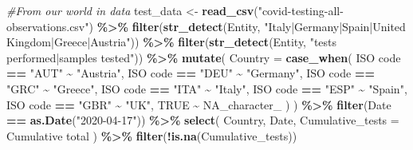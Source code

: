 \documentclass[
]{article}
\newenvironment{Shaded}{\begin{snugshade}}{\end{snugshade}}
\newcommand{\CommentTok}[1]{\textcolor[rgb]{0.56,0.35,0.01}{\textit{#1}}}
\newcommand{\DataTypeTok}[1]{\textcolor[rgb]{0.13,0.29,0.53}{#1}}
\newcommand{\KeywordTok}[1]{\textcolor[rgb]{0.13,0.29,0.53}{\textbf{#1}}}
\newcommand{\NormalTok}[1]{#1}
\newcommand{\OperatorTok}[1]{\textcolor[rgb]{0.81,0.36,0.00}{\textbf{#1}}}
\newcommand{\OtherTok}[1]{\textcolor[rgb]{0.56,0.35,0.01}{#1}}
\newcommand{\StringTok}[1]{\textcolor[rgb]{0.31,0.60,0.02}{#1}}
\begin{document}
\begin{Shaded}
\begin{Highlighting}[]
\CommentTok{\#From our world in data}
\NormalTok{test\_data \textless{}{-}}\StringTok{ }\KeywordTok{read\_csv}\NormalTok{(}\StringTok{"covid{-}testing{-}all{-}observations.csv"}\NormalTok{) }\OperatorTok{\%\textgreater{}\%}
\StringTok{  }\KeywordTok{filter}\NormalTok{(}\KeywordTok{str\_detect}\NormalTok{(Entity, }\StringTok{"Italy|Germany|Spain|United Kingdom|Greece|Austria"}\NormalTok{)) }\OperatorTok{\%\textgreater{}\%}
\StringTok{  }\KeywordTok{filter}\NormalTok{(}\KeywordTok{str\_detect}\NormalTok{(Entity, }\StringTok{"tests performed|samples tested"}\NormalTok{)) }\OperatorTok{\%\textgreater{}\%}\StringTok{ }
\StringTok{  }\KeywordTok{mutate}\NormalTok{(}
    \DataTypeTok{Country =} \KeywordTok{case\_when}\NormalTok{(}
      \StringTok{\textasciigrave{}}\DataTypeTok{ISO code}\StringTok{\textasciigrave{}} \OperatorTok{==}\StringTok{ "AUT"} \OperatorTok{\textasciitilde{}}\StringTok{ "Austria"}\NormalTok{,}
      \StringTok{\textasciigrave{}}\DataTypeTok{ISO code}\StringTok{\textasciigrave{}} \OperatorTok{==}\StringTok{ "DEU"} \OperatorTok{\textasciitilde{}}\StringTok{ "Germany"}\NormalTok{,}
      \StringTok{\textasciigrave{}}\DataTypeTok{ISO code}\StringTok{\textasciigrave{}} \OperatorTok{==}\StringTok{ "GRC"} \OperatorTok{\textasciitilde{}}\StringTok{ "Greece"}\NormalTok{,}
      \StringTok{\textasciigrave{}}\DataTypeTok{ISO code}\StringTok{\textasciigrave{}} \OperatorTok{==}\StringTok{ "ITA"} \OperatorTok{\textasciitilde{}}\StringTok{ "Italy"}\NormalTok{,}
      \StringTok{\textasciigrave{}}\DataTypeTok{ISO code}\StringTok{\textasciigrave{}} \OperatorTok{==}\StringTok{ "ESP"} \OperatorTok{\textasciitilde{}}\StringTok{ "Spain"}\NormalTok{,}
      \StringTok{\textasciigrave{}}\DataTypeTok{ISO code}\StringTok{\textasciigrave{}} \OperatorTok{==}\StringTok{ "GBR"} \OperatorTok{\textasciitilde{}}\StringTok{ "UK"}\NormalTok{,}
      \OtherTok{TRUE} \OperatorTok{\textasciitilde{}}\StringTok{ }\OtherTok{NA\_character\_}
\NormalTok{    )}
\NormalTok{  ) }\OperatorTok{\%\textgreater{}\%}
\StringTok{  }\KeywordTok{filter}\NormalTok{(Date }\OperatorTok{==}\StringTok{ }\KeywordTok{as.Date}\NormalTok{(}\StringTok{"2020{-}04{-}17"}\NormalTok{)) }\OperatorTok{\%\textgreater{}\%}
\StringTok{  }\KeywordTok{select}\NormalTok{(}
\NormalTok{    Country,}
\NormalTok{    Date,}
    \DataTypeTok{Cumulative\_tests =} \StringTok{\textasciigrave{}}\DataTypeTok{Cumulative total}\StringTok{\textasciigrave{}}
\NormalTok{  ) }\OperatorTok{\%\textgreater{}\%}
\StringTok{  }\KeywordTok{filter}\NormalTok{(}\OperatorTok{!}\KeywordTok{is.na}\NormalTok{(Cumulative\_tests))}
\end{Highlighting}
\end{Shaded}
\end{document}
